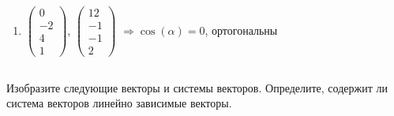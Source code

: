 \documentclass[11pt, a4paper]{extarticle}
\begin{document}
\begin{enumerate}[label=\alph*)]
			\item $\begin{pmatrix}
			0 \\
			-2 \\
			4 \\
			1
			\end{pmatrix}$, $\begin{pmatrix}
			12 \\
			-1 \\
			-1 \\
			2
			\end{pmatrix}$ $\Rightarrow \cos(\alpha) = 0$, ортогональны
		\end{enumerate}

	\subsection{}
	Изобразите следующие векторы и системы векторов. Определите, содержит ли система векторов линейно зависимые векторы. 
\end{document}
